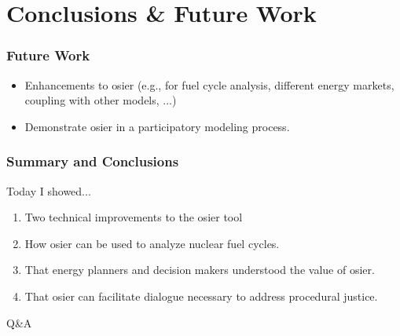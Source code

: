 \section{Conclusions \& Future Work}

\begin{frame}
    \frametitle{Future Work}

    \begin{itemize}
        \item Enhancements to \gls{osier} (e.g., for fuel cycle analysis, different energy markets, coupling with
        other models, ...)
        \item Demonstrate \gls{osier} in a participatory modeling process.
    \end{itemize}
\end{frame}


\begin{frame}
    \frametitle{Summary and Conclusions}
    Today I showed... 
    \begin{enumerate}
        \item Two technical improvements to the \gls{osier} tool
        \item How \gls{osier} can be used to analyze nuclear fuel cycles.
        \item That energy planners and decision makers understood the value of \gls{osier}.
        \item That \gls{osier} can facilitate dialogue necessary to address procedural justice.
    \end{enumerate}
\end{frame}


\begin{frame}

    Q\&A
    
\end{frame}